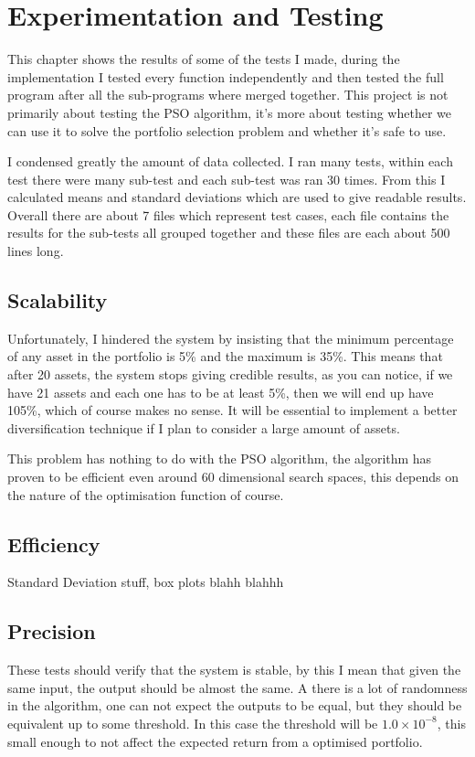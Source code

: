 \chapter{Experimentation and Testing}
This chapter shows the results of some of the tests I made, during the implementation I tested every function independently and then tested the full program after all the sub-programs where merged together. This project is not primarily about testing the PSO algorithm, it's more about testing whether we can use it to solve the portfolio selection problem and whether it's safe to use. 

I condensed greatly the amount of data collected. I ran many tests, within each test there were many sub-test and each sub-test was ran 30 times. From this I calculated means and standard deviations which are used to give readable results. Overall there are about 7 files which represent test cases, each file contains the results for the sub-tests all grouped together and these files are each about 500 lines long.  
  \section{Scalability} %
  \label{sec:scalability}
    Unfortunately, I hindered the system by insisting that the minimum percentage of any asset in the portfolio is 5\% and the maximum is 35\%. This means that after 20 assets, the system stops giving credible results, as you can notice, if we have 21 assets and each one has to be at least 5\%, then we will end up have 105\%, which of course makes no sense. It will be essential to implement a better diversification technique if I plan to consider a large amount of assets. 

    This problem has nothing to do with the PSO algorithm, the algorithm has proven to be efficient even around 60 dimensional search spaces, this depends on the nature of the optimisation function of course. 

  \section{Efficiency} %
  \label{sec:efficiency}
    Standard Deviation stuff, box plots blahh blahhh

  \section{Precision} %
  \label{sec:precision}
  These tests should verify that the system is stable, by this I mean that given the same input, the output should be almost the same. A there is a lot of randomness in the algorithm, one can not expect the outputs to be equal, but they should be equivalent up to some threshold. In this case the threshold will be $1.0\times10^{-8}$, this small enough to not affect the expected return from a optimised portfolio. 

